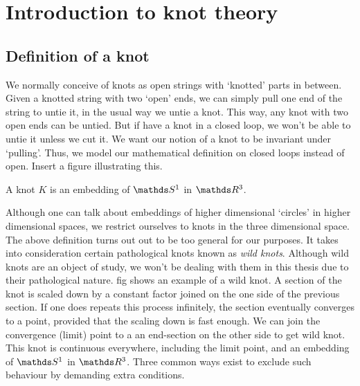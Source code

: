 \chapter{Introduction to knot theory}

\section{Definition of a knot}

We normally conceive of knots as open strings with `knotted' parts in between. Given a knotted string with two `open' ends, we can simply pull one end of the string to untie it, in the usual way we untie a knot. This way, any knot with two open ends can be untied. But if have a knot in a closed loop, we won't be able to untie it unless we cut it. We want our notion of a knot to be invariant under `pulling'. Thus, we model our mathematical definition on closed loops instead of open. Insert a figure illustrating this.
\begin{defn}
    A knot \(K\) is an embedding of \(\sone\) in \(\rthree\).
\end{defn}
Although one can talk about embeddings of higher dimensional `circles' in higher dimensional spaces, we restrict ourselves to knots in the three dimensional space. The above definition turns out out to be too general for our purposes. It takes into consideration certain pathological knots known as \textit{wild knots}. Although wild knots are an object of study, we won't be dealing with them in this thesis due to their pathological nature. fig shows an example of a wild knot. A section of the knot is scaled down by a constant factor joined on the one side of the previous section. If one does repeats this process infinitely, the section eventually converges to a point, provided that the scaling down is fast enough. We can join the convergence (limit) point to a an end-section on the other side to get wild knot. This knot is continuous everywhere, including the limit point, and an embedding of \(\sone\) in \(\rthree\). Three common ways exist to exclude such behaviour by demanding extra conditions.

